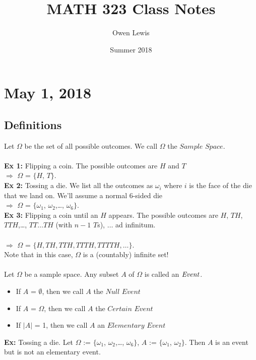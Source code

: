 \documentclass{article}
\title{MATH 323 Class Notes}
\author{Owen Lewis}
\date{Summer 2018}
\newcommand{\ti}[1]{\textit{#1}}
\newcommand{\imply}{\Rightarrow}
\begin{document}
\begin{titlepage}
\maketitle
\end{titlepage}

\tableofcontents
\newpage


\section{May 1, 2018}
\subsection{Definitions}
Let $\Omega$ be the set of all possible outcomes. We call $\Omega$ the $\ti{Sample Space}$.\\\\
\textbf{Ex 1:} Flipping a coin. The possible outcomes are $H$ and $T$\\
$\imply$ $\Omega$ = $\{$$H$, $T$$\}$.\\
\textbf{Ex 2:} Tossing a die. We list all the outcomes as $\omega_{i}$ where $i$ is the face of the die that we land on. We'll assume a normal 6-sided die\\ 
$\imply$ $\Omega$ = $\{$$\omega_{1}$, $\omega_{2}$,\dots, $\omega_{6}$$\}$.\\
\textbf{Ex 3:} Flipping a coin until an $H$ appears. The possible outcomes are $H$, $TH$, $TTH$,\dots, $TT$$\dots$$TH$ (with $n-1$ $T$s), $\dots$ ad infinitum.\\\\
$\imply$ $\Omega$ = $\{$$H, TH, TTH, TTTH, TTTTH,\dots$$\}$.\\
Note that in this case, $\Omega$ is a (countably) infinite set!\\\\
Let $\Omega$ be a sample space. Any subset $A$ of $\Omega$ is called an $\it{Event}$.
\begin{itemize}
	\item If $A$ = $\emptyset$, then we call $A$ the $\ti{Null Event}$
	\item If $A$ = $\Omega$, then we call $A$ the $\ti{Certain Event}$
	\item If $|$$A$$|$ = 1, then we call $A$ an $\ti{Elementary Event}$
\end{itemize}
\textbf{Ex:} Tossing a die. Let $\Omega$ := $\{$$\omega_{1}$, $\omega_{2}$,\dots, $\omega_{6}$$\}$, $A$ := $\{$$\omega_{1}$, $\omega_{2}$$\}$. Then $A$ is an event but is not an elementary event.\\\\
\end{document}
